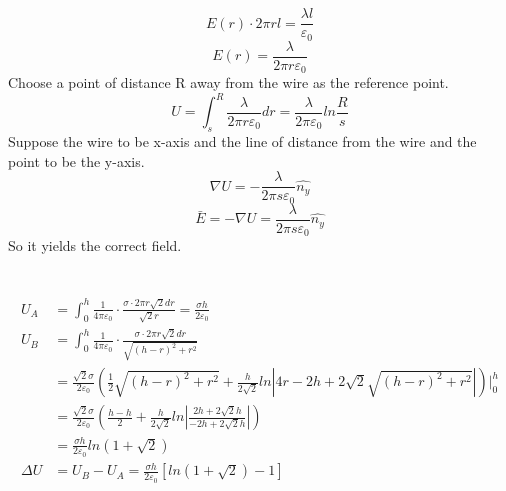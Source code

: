 \documentclass{article}
\begin{document}
\section{}
$$E(r)\cdot2\pi rl=\frac{\lambda l}{\varepsilon_0}$$
$$E(r)=\frac{\lambda}{2\pi r\varepsilon_0}$$
Choose a point of distance R away from the wire as the reference point.
$$U=\int_s^R\frac{\lambda}{2\pi r\varepsilon_0}dr=\frac{\lambda}{2\pi\varepsilon_0}ln\frac{R}{s}$$
Suppose the wire to be x-axis and the line of distance from the wire and the point to be the y-axis.
$$\nabla U=-\frac{\lambda}{2\pi s\varepsilon_0}\hat{n_y}$$
$$\bar{E}=-\nabla U=\frac{\lambda}{2\pi s\varepsilon_0}\hat{n_y}$$
So it yields the correct field.

\section{}

\begin{align*}
U_A&=\int_0^h\frac{1}{4\pi\varepsilon_0}\cdot\frac{\sigma\cdot2\pi r\sqrt{2}dr}{\sqrt{2}r}=\frac{\sigma h}{2\varepsilon_0}\\
U_B&=\int_0^h\frac{1}{4\pi\varepsilon_0}\cdot\frac{\sigma\cdot2\pi r\sqrt{2}dr}{\sqrt{(h-r)^2+r^2}}\\
&=\frac{\sqrt{2}\sigma}{2\varepsilon_0}\left(\frac{1}{2}\sqrt{(h-r)^2+r^2}+\frac{h}{2\sqrt{2}}ln|4r-2h+2\sqrt{2}\sqrt{(h-r)^2+r^2}|\right)\bigg|_0^h\\
&=\frac{\sqrt{2}\sigma}{2\varepsilon_0}\left(\frac{h-h}{2}+\frac{h}{2\sqrt{2}}ln\left|\frac{2h+2\sqrt{2}h}{-2h+2\sqrt{2}h}\right|\right)\\
&=\frac{\sigma h}{2\varepsilon_0}ln(1+\sqrt{2})\\
\Delta U&=U_B-U_A=\frac{\sigma h}{2\varepsilon_0}[ln(1+\sqrt{2})-1]
\end{align*}
\end{document}

